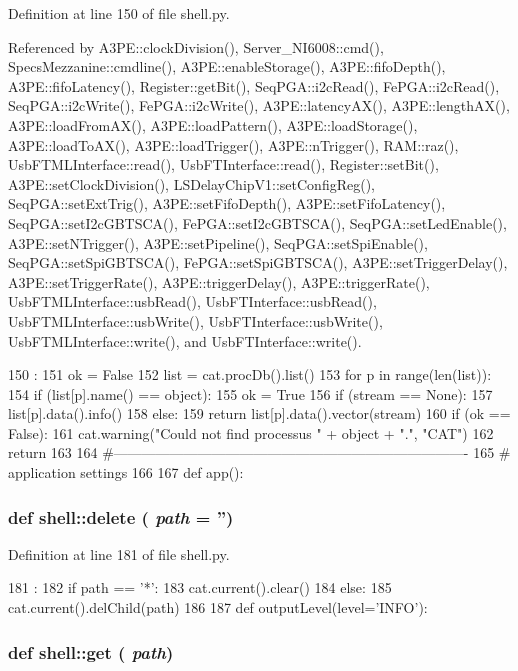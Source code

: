 Definition at line 150 of file shell.py.

Referenced by A3PE::clockDivision(), Server\_\-NI6008::cmd(), SpecsMezzanine::cmdline(), A3PE::enableStorage(), A3PE::fifoDepth(), A3PE::fifoLatency(), Register::getBit(), SeqPGA::i2cRead(), FePGA::i2cRead(), SeqPGA::i2cWrite(), FePGA::i2cWrite(), A3PE::latencyAX(), A3PE::lengthAX(), A3PE::loadFromAX(), A3PE::loadPattern(), A3PE::loadStorage(), A3PE::loadToAX(), A3PE::loadTrigger(), A3PE::nTrigger(), RAM::raz(), UsbFTMLInterface::read(), UsbFTInterface::read(), Register::setBit(), A3PE::setClockDivision(), LSDelayChipV1::setConfigReg(), SeqPGA::setExtTrig(), A3PE::setFifoDepth(), A3PE::setFifoLatency(), SeqPGA::setI2cGBTSCA(), FePGA::setI2cGBTSCA(), SeqPGA::setLedEnable(), A3PE::setNTrigger(), A3PE::setPipeline(), SeqPGA::setSpiEnable(), SeqPGA::setSpiGBTSCA(), FePGA::setSpiGBTSCA(), A3PE::setTriggerDelay(), A3PE::setTriggerRate(), A3PE::triggerDelay(), A3PE::triggerRate(), UsbFTMLInterface::usbRead(), UsbFTInterface::usbRead(), UsbFTMLInterface::usbWrite(), UsbFTInterface::usbWrite(), UsbFTMLInterface::write(), and UsbFTInterface::write().


\begin{DoxyCode}
150                              :
151   ok = False
152   list = cat.procDb().list()
153   for p in range(len(list)):
154     if (list[p].name() == object):
155       ok = True
156       if (stream == None):
157         list[p].data().info()
158       else:
159         return list[p].data().vector(stream)
160   if (ok == False):
161     cat.warning("Could not find processus " + object + ".", "CAT")
162     return
163 
164 #----------------------------------------------------------------------------
165 # application settings
166 
167 
def app():
\end{DoxyCode}
\hypertarget{namespaceshell_a2fba7cda81dff6d2d8b092dbd17fd429}{
\subsubsection[{delete}]{\setlength{\rightskip}{0pt plus 5cm}def shell::delete ( {\em path} = {\ttfamily ''})}}
\label{namespaceshell_a2fba7cda81dff6d2d8b092dbd17fd429}


Definition at line 181 of file shell.py.


\begin{DoxyCode}
181                    :
182   if path == '*':
183     cat.current().clear()
184   else:
185     cat.current().delChild(path)
186 
187 
def outputLevel(level='INFO'):
\end{DoxyCode}
\hypertarget{namespaceshell_a8ba5de299d75ec2ee8ea88402a07ba47}{
\subsubsection[{get}]{\setlength{\rightskip}{0pt plus 5cm}def shell::get ( {\em path})}}
\label{namespaceshell_a8ba5de299d75ec2ee8ea88402a07ba47}


